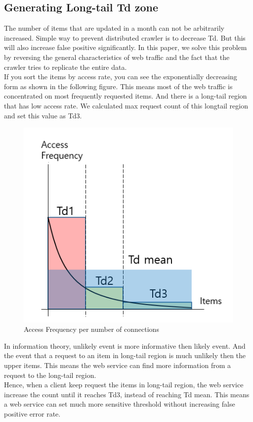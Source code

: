 \documentclass[sigconf,anonymous=false]{acmart}
\begin{document}
\subsection{Generating Long-tail Td zone}
The number of items that are updated in a month can not be arbitrarily increased. Simple way to prevent distributed crawler is to decrease Td. But this will also increase false positive significantly. In this paper, we solve this problem by reversing the general characteristics of web traffic and the fact that the crawler tries to replicate the entire data.\\
If you sort the items by access rate, you can see the exponentially decreasing form as shown in the following figure. This means most of the web traffic is concentrated on most frequently requested items. And there is a long-tail region that has low access rate. We calculated max request count of this longtail region and set this value as Td3.

\begin{figure}[H]
    \includegraphics[width=0.7\columnwidth]{figs/figure_01.png}
    \caption{Access Frequency per number of connections}
    \label{fig:my_label}
\end{figure}

In information theory, unlikely event is more informative then likely event. And the event that a request to an item in long-tail region is much unlikely then the upper items. This means the web service can find more information from a request to the long-tail region.\\
Hence, when a client keep request the items in long-tail region, the web service increase the count until it reaches Td3, instead of reaching Td mean. This means a web service can set much more sensitive threshold without increasing false positive error rate.\\
\end{document}
